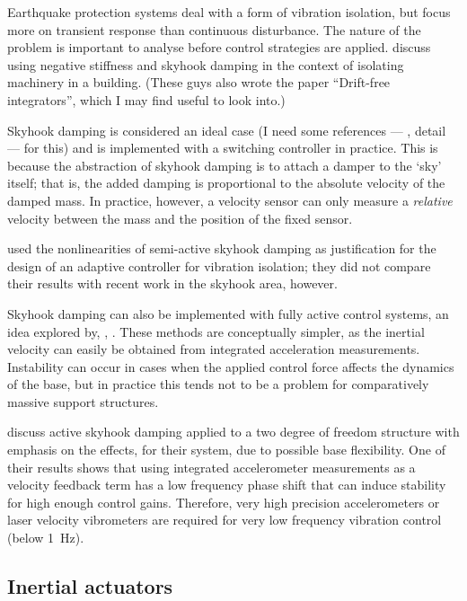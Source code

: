 Earthquake protection systems deal with a form of vibration isolation,
but focus more on transient response than continuous disturbance. The
nature of the problem is important to analyse before control
strategies are applied. \textcite{gavin2007} discuss using negative
stiffness and skyhook damping in the context of isolating machinery
in a building. (These guys also wrote the paper ``Drift-free
integrators'', which I may find useful to look into.)

Skyhook damping is considered an ideal case (I need some references
— \ie, detail — for this) and is implemented with a switching
controller in practice. This is because the abstraction of skyhook
damping is to attach a damper to the `sky' itself; that is, the added
damping is proportional to the absolute velocity of the damped
mass. In practice, however, a velocity sensor can only measure a
\emph{relative} velocity between the mass and the position of the
fixed sensor.

\textcite{song2007} used the nonlinearities of semi-active skyhook damping as
justification for the design of an adaptive controller for vibration
isolation; they did not compare their results with recent work in the skyhook
area, however.

Skyhook damping can also be implemented with fully active control systems, an
idea explored by, \eg, \textcite{elliott2001,elliott2004,yan2006,kim2008a}
. These methods are conceptually simpler, as the
inertial velocity can easily be obtained from integrated acceleration
measurements. Instability can occur in cases when the applied control force
affects the dynamics of the base, but in practice this tends not to be a
problem for comparatively massive support structures.

\textcite{serrand2000} discuss active skyhook damping applied to a two degree
of freedom structure with emphasis on the effects, for their system, due to
possible base flexibility. One of their results shows that using integrated
accelerometer measurements as a velocity feedback term has a low frequency
phase shift that can induce stability for high enough control gains.
Therefore, very high precision accelerometers or laser velocity vibrometers
are required for very low frequency vibration control (below \SI{1}{Hz}).




\subsection{Inertial actuators}

